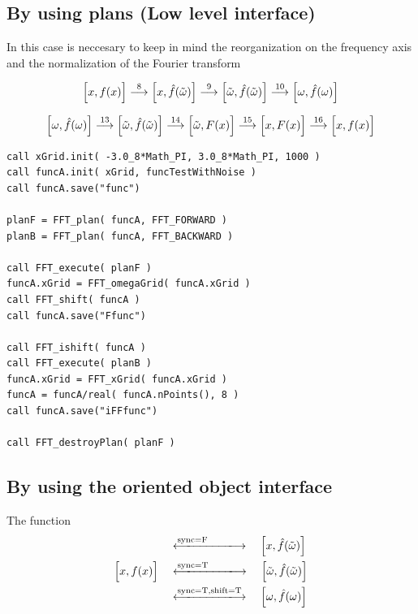 \subsection{By using plans (Low level interface)}
In this case is neccesary to keep in mind the reorganization on the frequency axis and the normalization
of the Fourier transform

\begin{equation}
\Bigl[x,f(x)\Bigr]
\stackrel{\text{8}}{\longrightarrow}
\Bigl[x,\hat{f}(\tilde{\omega})\Bigr]
\stackrel{\text{9}}{\longrightarrow}
\Bigl[\tilde{\omega},\hat{f}(\tilde{\omega})\Bigr]
\stackrel{\text{10}}{\longrightarrow}
\Bigl[\omega,\hat{f}(\omega)\Bigr]
\end{equation}

\begin{equation}
\Bigl[\omega,\hat{f}(\omega)\Bigr]
\stackrel{\text{13}}{\longrightarrow}
\Bigl[\tilde{\omega},\hat{f}(\tilde{\omega})\Bigr]
\stackrel{\text{14}}{\longrightarrow}
\Bigl[\tilde{\omega},F(x)\Bigr]
\stackrel{\text{15}}{\longrightarrow}
\Bigl[x,F(x)\Bigr]
\stackrel{\text{16}}{\longrightarrow}
\Bigl[x,f(x)\Bigr]
\end{equation}

\lstset{language=Fortran}
\begin{lstlisting}
call xGrid.init( -3.0_8*Math_PI, 3.0_8*Math_PI, 1000 )
call funcA.init( xGrid, funcTestWithNoise )
call funcA.save("func")
 		
planF = FFT_plan( funcA, FFT_FORWARD )
planB = FFT_plan( funcA, FFT_BACKWARD )
 		
call FFT_execute( planF )
funcA.xGrid = FFT_omegaGrid( funcA.xGrid )
call FFT_shift( funcA )
call funcA.save("Ffunc")

call FFT_ishift( funcA )
call FFT_execute( planB )
funcA.xGrid = FFT_xGrid( funcA.xGrid )
funcA = funcA/real( funcA.nPoints(), 8 )
call funcA.save("iFFfunc")

call FFT_destroyPlan( planF )
\end{lstlisting}

\subsection{By using the oriented object interface}
The function 
\begin{equation}
\begin{aligned}
&
\xlongleftrightarrow{\text{sync=F}\qquad\quad}
\quad\Bigl[x,\hat{f}(\tilde{\omega})\Bigr]
\\
\Bigl[x,f(x)\Bigr]\quad
&
\xlongleftrightarrow{\text{sync=T}\qquad\quad}
\quad\Bigl[\tilde{\omega},\hat{f}(\tilde{\omega})\Bigr]
\\
&
\xlongleftrightarrow{\text{sync=T,shift=T}}
\quad\Bigl[\omega,\hat{f}(\omega)\Bigr]
\end{aligned}
\end{equation}

